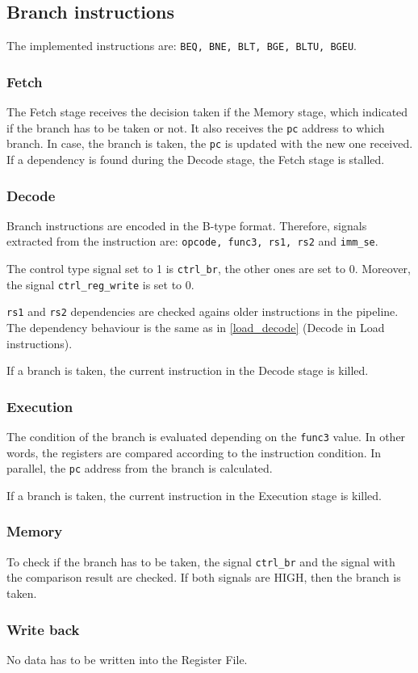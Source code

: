 \subsection{Branch instructions}
The implemented instructions are: \texttt{BEQ, BNE, BLT, BGE, BLTU, BGEU}.

\subsubsection{Fetch}
The Fetch stage receives the decision taken if the Memory stage, which indicated if the branch has to be taken or not. 
It also receives the \texttt{pc} address to which branch.
In case, the branch is taken, the \texttt{pc} is updated with the new one received.
If a dependency is found during the Decode stage, the Fetch stage is stalled.

\subsubsection{Decode}
Branch instructions are encoded in the B-type format.
Therefore, signals extracted from the instruction are: \texttt{opcode, func3, rs1, rs2} and \texttt{imm\_se}.

The control type signal set to 1 is \texttt{ctrl\_br}, the other ones are set to 0.
Moreover, the signal \texttt{ctrl\_reg\_write} is set to 0.

\texttt{rs1} and \texttt{rs2} dependencies are checked agains older instructions in the pipeline. 
The dependency behaviour is the same as in \autoref{load_decode} (Decode in Load instructions).

If a branch is taken, the current instruction in the Decode stage is killed.

\subsubsection{Execution}
The condition of the branch is evaluated depending on the \texttt{func3} value.
In other words, the registers are compared according to the instruction condition.
In parallel, the \texttt{pc} address from the branch is calculated.

If a branch is taken, the current instruction in the Execution stage is killed.

\subsubsection{Memory}
To check if the branch has to be taken, the signal \texttt{ctrl\_br} and the signal with the comparison result are checked. 
If both signals are HIGH, then the branch is taken.

\subsubsection{Write back}
No data has to be written into the Register File.


